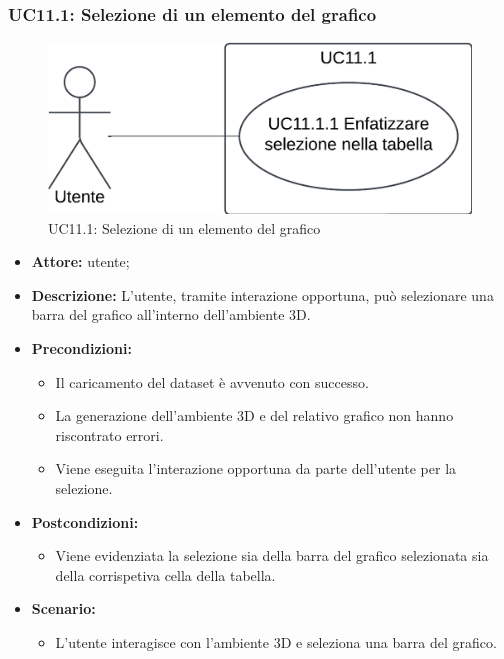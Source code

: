 \pagebreak

\subsubsection{UC11.1: Selezione di un elemento del grafico}
\begin{figure}[h!]\centering
    \includegraphics[scale=0.7]{template/images/UC11.1.png}
    \caption{UC11.1: Selezione di un elemento del grafico}
\end{figure}
\begin{itemize}    
    \item \textbf{Attore:} utente;
    \item \textbf{Descrizione:} L'utente, tramite interazione opportuna, può selezionare una barra del grafico all'interno dell'ambiente 3D.
    \item \textbf{Precondizioni:}    
        \begin{itemize}
            \item Il caricamento del dataset è avvenuto con successo.
            \item La generazione dell'ambiente 3D e del relativo grafico non hanno riscontrato errori.
            \item Viene eseguita l'interazione opportuna da parte dell'utente per la selezione.
        \end{itemize}    
    \item \textbf{Postcondizioni:}
        \begin{itemize}
            \item Viene evidenziata la selezione sia della barra del grafico selezionata sia della corrispetiva cella della tabella.
        \end{itemize}    
    \item \textbf{Scenario:} 
        \begin{itemize}
            \item L'utente interagisce con l'ambiente 3D e seleziona una barra del grafico.
        \end{itemize}
\end{itemize}
